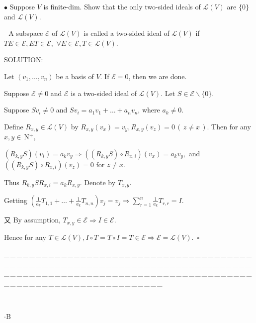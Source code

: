 \documentclass[a4paper, 11pt, UTF8]{article}
\def\Lm{\mathcal{L}}
\def\Nbp{$\,{\timesbf N}$^+}
\begin{document}
\begin{large}
{\small $\bullet$} {\timessl\Large 
Suppose $V$ is finite-dim. Show that the only two-sided ideals of $\Lm(V)$ are $\{0\}$ and $\Lm(V)$.}\par\,\,
{\timessl A subspace $\mathcal{E}$ of $\Lm(V)$ is called a two-sided ideal of $\Lm(V)$ if $TE\in\mathcal{E},ET\in\mathcal{E},\,\,\forall E\in\mathcal{E},T\in\Lm(V)$.
}\par
{\timesbf S\footnotesize{OLUTION:}}\par\quad\Large
Let $(v_1,\dots,v_n)$ be a basis of $V$. If $\mathcal{E}=0$, then we are done.\par\quad
Suppose $\mathcal{E}\neq 0$ and $\mathcal{E}$ is a two-sided ideal of $\Lm(V)$. Let $S\in\mathcal{E}\backslash\{0\}$.\par\quad
Suppose $Sv_i\neq 0$ and $Sv_i=a_1 v_1+\dots+a_n v_n$, where $a_k\neq 0$.\par\quad
Define $R_{x,y}\in\Lm(V)$ by $R_{x,y}(v_x)=v_y, R_{x,y}(v_z)=0\,(\,z\neq x\,)$. Then for any $x,y\in\Nbp,$\par\quad
$(R_{k,y}S)(v_i)=a_k v_y\Rightarrow((R_{k,y}S)\circ R_{x,i})(v_x)=a_k v_y,$ and $((R_{k,y}S)\circ R_{x,i})(v_z)=0$ for $z\neq x$.\par\quad
Thus $R_{k,y}SR_{x,i}=a_k R_{x,y}$. Denote by $T_{x,y}$.\par\quad
Getting $(\frac{1}{a_k}T_{1,1}+\dots+\frac{1}{a_k}T_{n,n})v_j=v_j\Rightarrow\sum\limits_{r=1}^n \frac{1}{a_k}T_{r,r}=I.$\par\quad
又 By assumption, $T_{x,y}\in\mathcal{E}\Rightarrow I\in\mathcal{E}.$\par\quad
Hence for any $T\in\Lm(V),I\circ T=T\circ I=T\in\mathcal{E}\Rightarrow \mathcal{E}=\Lm(V).\,\,\,\square$\par\large
{\tiny \_\,\_\,\_\,\_\,\_\,\_\,\_\,\_\,\_\,\_\,\_\,\_\,\_\,\_\,\_\,\_\,\_\,\_\,\_\,\_\,\_\,\_\,\_\,\_\,\_\,\_\,\_\,\_\,\_\,\_\,\_\,\_\,\_\,\_\,\_\,\_\,\_\,\_\,\_\,\_\,\_\,\_\,\_\,\_\,\_\,\_\,\_\,\_\,\_\,\_\,\_\,\_\,\_\,\_\,\_\,\_\,\_\,\_\,\_\,\_\,\_\,\_\,\_\,\_\,\_\,\_\,\_\,\_\,\_\,\_\,\_\_\,\_\,\_\,\_\,\_\,\_\,\_\,\_\,\_\,\_\,\_\,\_\,\_\,\_\,\_\,\_\,\_\,\_\,\_\,\_\,\_\,\_\,\_\,\_\,\_\,\_\,\_\,\_\,\_\,\_\,\_\,\_\,\_\,\_\,\_\,\_\,\_\,\_\,\_\,\_\,\_\,\_\,\_\,\_\,\_\,\_\,\_\,\_\,\_\,\_\,\_\,\_\,\_\,\_\,\_\,\_\,\_\,\_\,\_\,\_\,\_\,\_\,\_\,\_\,\_\,\_\,\_\,\_\,\_\,\_\,\_}{\tiny\,\par}

\par

{\huge{}$\cdot$B} %


\end{large}
\end{document}
